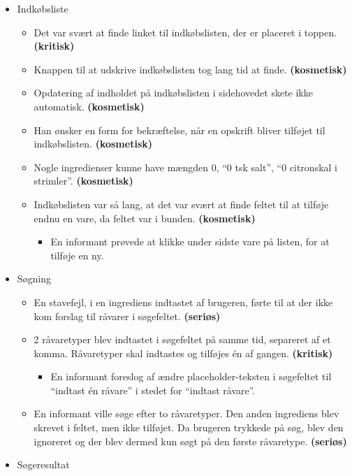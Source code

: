  \begin{itemize}[noitemsep]
 \item Indkøbsliste
  \begin{itemize}[noitemsep]
  \item Det var svært at finde linket til indkøbslisten, der er placeret i toppen. \textbf{(kritisk)}
  \item Knappen til at udskrive indkøbslisten tog lang tid at finde.  \textbf{(kosmetisk)}
  \item Opdatering af indholdet på indkøbslisten i sidehovedet skete ikke automatisk. \textbf{(kosmetisk)}
  \item Han ønsker en form for bekræftelse, når en opskrift bliver tilføjet til indkøbslisten. \textbf{(kosmetisk)}
  \item Nogle ingredienser kunne have mængden 0, \fx “0 tsk salt”, “0 citronskal i strimler”. \textbf{(kosmetisk)}
  \item Indkøbslisten var så lang, at det var svært at finde feltet til at tilføje endnu en vare, da feltet var i bunden.  \textbf{(kosmetisk)}
   \begin{itemize}[noitemsep]
   \item En informant prøvede at klikke under sidste vare på listen, for at tilføje en ny.
   \end{itemize}
  \end{itemize}
 \item Søgning
  \begin{itemize}[noitemsep]
  \item En stavefejl, i en ingrediens indtastet af brugeren, førte til at der ikke kom forslag til råvarer i søgefeltet.  \textbf{(seriøs)}
  \item 2 råvaretyper blev indtastet i søgefeltet på samme tid, separeret af et komma. Råvaretyper skal indtastes og tilføjes én af gangen. \textbf{(kritisk)}
   \begin{itemize}[noitemsep]
   \item En informant foreslog af ændre placeholder-teksten i søgefeltet til ``indtast én råvare'' i stedet for ``indtast råvare''.
   \end{itemize}
  \item En informant ville søge efter to råvaretyper. Den anden ingrediens blev skrevet i feltet, men ikke tilføjet. Da brugeren trykkede på søg, blev den ignoreret og der blev dermed kun søgt på den første råvaretype. \textbf{(seriøs)}
  \end{itemize}
 \item Søgeresultat

\end{itemize}
